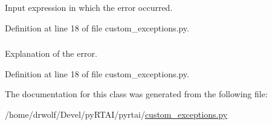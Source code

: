 \-Input expression in which the error occurred. 



\-Definition at line 18 of file custom\-\_\-exceptions.\-py.

\hypertarget{classpyrtai_1_1custom__exceptions_1_1_rtai_config_error_a55d1fa78a1ddc2d19f702e92566d65ce}{
\subsubsection[{msg}]{}}
\label{classpyrtai_1_1custom__exceptions_1_1_rtai_config_error_a55d1fa78a1ddc2d19f702e92566d65ce}


\-Explanation of the error. 



\-Definition at line 18 of file custom\-\_\-exceptions.\-py.



\-The documentation for this class was generated from the following file\-:\begin{DoxyCompactItemize}
\item 
/home/drwolf/\-Devel/py\-R\-T\-A\-I/pyrtai/\hyperlink{custom__exceptions_8py}{custom\-\_\-exceptions.\-py}\end{DoxyCompactItemize}
